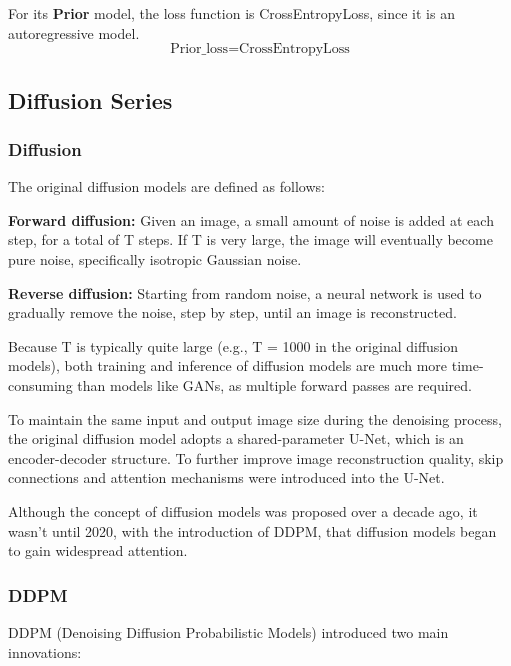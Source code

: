 \documentclass{article}
\begin{document}
For its \textbf{Prior} model, the loss function is CrossEntropyLoss, since it is an autoregressive model.
\begin{equation}
\text{Prior\_loss} = \text{CrossEntropyLoss}
\end{equation}

\subsection{Diffusion Series}

\subsubsection{Diffusion}

The original diffusion models are defined as follows:

\textbf{Forward diffusion:} Given an image, a small amount of noise is added at each step, for a total of T 
steps. If T is very large, the image will eventually become pure noise, specifically isotropic Gaussian 
noise.

\textbf{Reverse diffusion:} Starting from random noise, a neural network is used to gradually remove the 
noise, step by step, until an image is reconstructed.

Because T is typically quite large (e.g., T = 1000 in the original diffusion models), both training and 
inference of diffusion models are much more time-consuming than models like GANs, as multiple forward passes 
are required.

To maintain the same input and output image size during the denoising process, the original diffusion model 
adopts a shared-parameter U-Net, which is an encoder-decoder structure. To further improve image 
reconstruction quality, skip connections and attention mechanisms were introduced into the U-Net.

Although the concept of diffusion models was proposed over a decade ago, it wasn't until 2020, with the 
introduction of DDPM, that diffusion models began to gain widespread attention.

\subsubsection{DDPM}

DDPM (Denoising Diffusion Probabilistic Models) introduced two main innovations:
\end{document}
